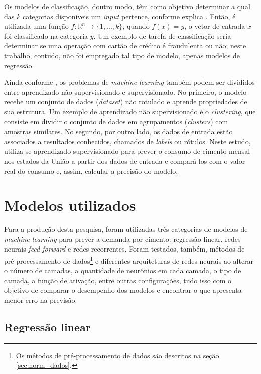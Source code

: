 Os modelos de classificação, doutro modo, têm como objetivo 
determinar a qual das $k$ categorias disponíveis um 
\textit{input} pertence, conforme explica \citet{dl-oreilly}. Então, é utilizada uma função  
$ f : \mathbb{R}^n \rightarrow \{1,...,k\}$, quando 
$ f(x) = y$, o vetor de entrada $x$ foi classificado 
na categoria $y$. Um exemplo de tarefa de classificação
seria determinar se uma operação com cartão de crédito 
é fraudulenta ou não; neste trabalho, contudo, não foi empregado 
tal tipo de modelo, apenas modelos de regressão. 

Ainda conforme \citet{Goodfellow-et-al-2016}, os problemas de 
\textit{machine learning} também podem ser divididos entre
aprendizado não-supervisionado e supervisionado. No primeiro, 
o modelo recebe um conjunto de dados (\textit{dataset}) não 
rotulado e aprende propriedades de sua estrutura. 
Um exemplo de aprendizado não supervisionado é o \textit{clustering},
que consiste em dividir o conjunto de dados
em agrupamentos (\textit{clusters}) com amostras similares. No segundo, por outro lado, 
os dados de entrada estão associados a resultados conhecidos, 
chamados de \textit{labels} ou rótulos. Neste estudo, utiliza-se aprendizado 
supervisionado para prever o consumo de cimento mensal nos 
estados da União a partir dos dados de entrada e compará-los 
com o valor real 
do consumo e, assim, calcular a precisão do modelo.

\section{Modelos utilizados}

Para a produção desta pesquisa, foram utilizadas três categorias de modelos de \textit{machine learning} para prever a demanda por cimento: regressão linear, redes
neurais \textit{feed forward} e redes recorrentes. Foram testados, também,
 métodos de pré-processamento de dados\footnote{Os métodos de pré-processamento de dados são descritos na seção \ref{sec:norm_dados}.} e  diferentes arquiteturas de 
redes neurais ao alterar o número de camadas, a quantidade de neurônios
em cada camada, o tipo de camada, a função de ativação, entre outras
configurações, tudo isso com o objetivo de comparar 
o desempenho dos modelos e encontrar o que apresenta menor erro na previsão.

\subsection{Regressão linear}
\label{sec:reg_lin}

